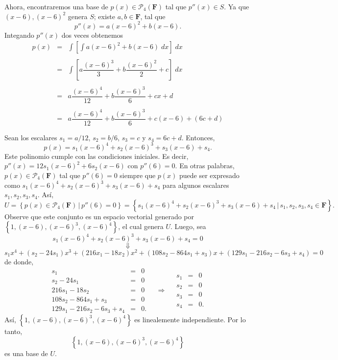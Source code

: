 \begin{enumerate}[\bfseries 1.]
\begin{enumerate}[(a)]
		Ahora, encontraremos una base de $p(x)\in \mathcal{P}_4(\textbf{F})$ tal que $p''(x)\in S$. Ya que $(x-6),(x-6)^2$ genera $S$; existe $a,b\in \textbf{F}$, tal que 
		$$p''(x)=a(x-6)^2+b(x-6).$$
		Integando $p''(x)$ dos veces obtenemos
		$$
		\begin{array}{rcl}
		    p(x)&=&\displaystyle\int\left[\int a(x-6)^2+b(x-6)\; dx\right]\; dx\\\\
			&=& \displaystyle\int \left[a\dfrac{(x-6)^3}{3}+b\dfrac{(x-6)^2}{2}+c\right]\;dx\\\\
			&=& a\dfrac{(x-6)^4}{12}+b\dfrac{(x-6)^3}{6}+cx+d\\\\
			&=& a\dfrac{(x-6)^4}{12}+b\dfrac{(x-6)^3}{6}+c(x-6)+(6c+d)\\\\
		\end{array}
		$$
		Sean los escalares $s_1=a/12$, $s_2=b/6$, $s_3=c$ y $s_4=6c+d$. Entonces,
		$$p(x)=s_1(x-6)^4+s_2(x-6)^3+s_3(x-6)+s_4.$$
		Este polinomio cumple con las condiciones iniciales. Es decir, $p''(x)=12s_1(x-6)^2+6s_2(x-6)$ con $p''(6)=0.$ En otras palabras, $p(x)\in \mathcal{P}_4(\textbf{F})$ tal que $p''(6)=0$ siempre que $p(x)$ puede ser expresado como $s_1(x-6)^4+s_2(x-6)^3+s_3(x-6)+s_4$ para algunos escalares $s_1,s_2,s_3,s_4$. Así,
		$$U=\left\{p(x)\in \mathcal{P}_4(\textbf{F})\,|\, p''(6)=0\right\}=\left\{s_1(x-6)^4+s_2(x-6)^3+s_3(x-6)+s_4\,|\, s_1,s_2,s_3,s_4\in \textbf{F}\right\}.$$
		Observe que este conjunto es un espacio vectorial generado por $\left\{1,(x-6),(x-6)^3,(x-6)^4\right\}$, el cual genera $U$. Luego, sea
		$$s_1(x-6)^4+s_2(x-6)^3+s_3(x-6)+s_4=0$$
		$$\Downarrow$$
		$$s_1x^4+(s_2-24s_1)x^3+(216x_1-18x_2)x^2+(108s_2-864s_1+s_3)x+(129s_1-216s_2-6s_3+s_4)=0$$
		de donde,
		$$
		\begin{array}{rcl}
		    s_1&=&0\\
		    s_2-24s_1&=&0\\
		    216s_1-18s_2&=&0\\
		    108s_2-864s_1+s_3&=&0\\
		    129s_1-216s_2-6s_3+s_4&=&0.
		\end{array}
		\quad \Rightarrow \quad 
		\begin{array}{rcl}
		    s_1&=&0\\
		    s_2&=&0\\
		    s_3&=&0\\
		    s_4&=&0.
		\end{array}
		$$
		Así, $\left\{1,(x-6),(x-6)^3,(x-6)^4\right\}$ es linealemente independiente. Por lo tanto, 
		$$\left\{1,(x-6),(x-6)^3,(x-6)^4\right\}$$ 
		es una base de $U$.\\\\


\end{enumerate}
\end{enumerate}

